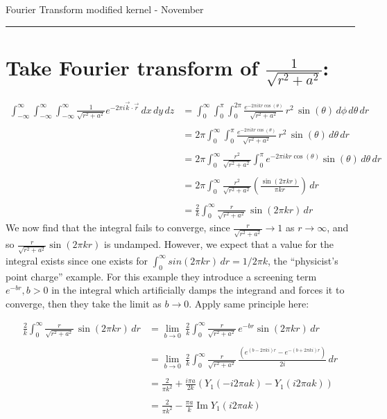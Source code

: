 \documentclass[letterpaper,10pt]{article}
\begin{document}
\begin{flushright}
{\Large Fourier Transform modified kernel - November}
\end{flushright}
\vskip -0.1in
\hrule
\vskip 0.4in

\vskip 0.1in
\section*{Take Fourier transform of $\frac{1}{\sqrt{r^2+a^2}}$:}

\begin{align*}
\int_{-\infty}^\infty\int_{-\infty}^\infty\int_{-\infty}^\infty \frac{1}{\sqrt{r^2+a^2}}e^{-2 \pi i\vec k\cdot \vec r }\,dx\,dy\,dz&=
\int_0^\infty\int_0^\pi \int_0^{2\pi} \frac{e^{-2 \pi ikr\cos(\theta)}}{\sqrt{r^2+a^2}}\,r^2\,\sin(\theta)\,d\phi\,d\theta\,dr\\\\
&=2\pi \int_0^\infty \int_0^\pi \frac{e^{-2 \pi ikr\cos(\theta)}}{\sqrt{r^2+a^2}}\,r^2\,\sin(\theta)\,d\theta\,dr\\\\
&=2\pi \int_0^\infty \frac{r^2}{\sqrt{r^2+a^2}} \int_0^\pi  e^{-2 \pi ikr\cos(\theta)}\sin(\theta)\,d\theta\,dr\,\\\\
&=2\pi \int_0^\infty \frac{r^2}{\sqrt{r^2+a^2}}\left(\frac{\sin(2\pi kr)}{\pi k r}\right)\,dr\\\\
&=\frac{2}{k} \int_0^\infty \frac{r}{\sqrt{r^2+a^2}}\,\sin(2\pi kr)\,dr
\end{align*}
We now find that the integral fails to converge, since $\frac{r}{\sqrt{r^2+a^2}} \to 1$ as $r \to \infty$, and so $\frac{r}{\sqrt{r^2+a^2}} \sin(2\pi kr)$ is undamped. However, we expect that a value for the integral exists since one exists for $\int_0^\infty sin(2 \pi kr) \,dr = 1/2 \pi k $, the ``physicist's point charge'' example. For this example they introduce a screening term $e^{-br}, b>0$ in the integral which artificially damps the integrand and forces it to converge, then they take the limit as $b\rightarrow 0$. Apply same principle here:

\begin{align*}
\frac{2}{k} \int_0^\infty \frac{r}{\sqrt{r^2+a^2}}\,\sin(2\pi kr)\,dr &= \lim_{b \to 0}\, \frac{2}{k} \int_0^\infty \frac{r}{\sqrt{r^2+a^2}}\,e^{-b r}\sin(2\pi kr)\,dr\\\\
&= \lim_{b \to 0}\, \frac{2}{k} \int_0^\infty \frac{r}{\sqrt{r^2+a^2}}\, \frac{( e^{(b - 2 \pi k i)r} - e^{-(b + 2 \pi k i)r})}{2 i}\, dr\\\\
&= \frac{2}{\pi k^2} + \frac{i \pi a}{2k} (Y_1(-i 2 \pi a k)-Y_1(i 2 \pi a k))\\\\
&= \frac{2}{\pi k^2} - \frac{\pi a}{k} \operatorname{Im}Y_1(i 2 \pi a k)
\end{align*}
\end{document}
